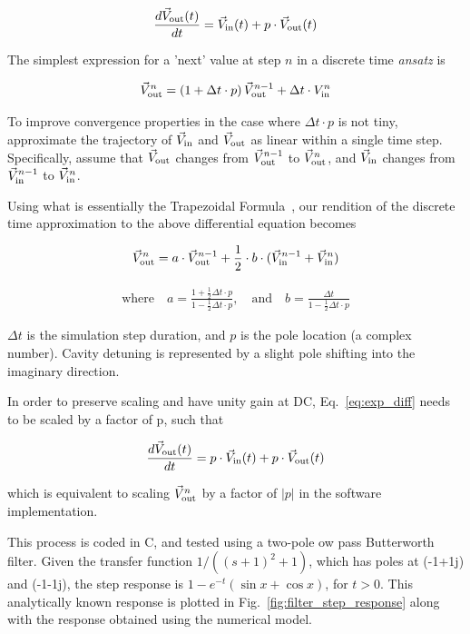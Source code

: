\documentclass[a4paper,12pt]{article}
\begin{document}
\begin{appendix}
\begin{equation}
 \frac{d\vec V_{\rm out}(t)}{dt} = \vec V_{\rm in}(t) + p\cdot \vec V_{\rm out}(t)
\label{eq:exp_diff}
\end{equation}

The simplest expression for a 'next' value at step $n$ in a discrete time \emph{ansatz} is

\begin{equation}
 \vec V_{\rm out}^n = \left( 1 + \Delta t \cdot p\right) \vec V_{\rm out}^{n-1} + \Delta t \cdot V_{\rm in}^n
\end{equation}

\noindent To improve convergence properties in the case where $\Delta t \cdot p$ is not tiny, approximate the trajectory of $\vec V_{\rm in}$ and $\vec V_{\rm out}$ as linear within a single time step. Specifically, assume that $\vec V_{\rm out}$ changes from $\vec V_{\rm out}^{n-1}$ to $\vec V_{\rm out}^n$, and $\vec V_{\rm in}$ changes from $\vec V_{\rm in}^{n-1}$ to $\vec V_{\rm in}^n$.

Using what is essentially the Trapezoidal Formula~\cite{ref:trapezoid}, our rendition of the discrete time approximation to the above differential equation becomes

\begin{equation} \label{eq:approx}
 	\vec V_{\rm out}^n=a \cdot \vec V_{\rm out}^{n-1}+\frac{1}{2}\cdot b \cdot (\vec V_{\rm in}^{n-1}+\vec V_{\rm in}^n)
\end{equation}

\begin{eqnarray}
	\nonumber \mbox{where} \quad a=\frac{1+ \frac{1}{2} \Delta t \cdot p}{1-\frac{1}{2}\Delta t \cdot p}, \quad \mbox{and} \quad b=\frac{\Delta t}{1-\frac{1}{2}\Delta t \cdot p}
\end{eqnarray}

\noindent $\Delta t$ is the simulation step duration, and $p$ is the pole location (a complex number). Cavity detuning is represented by a slight pole shifting into the imaginary direction.

In order to preserve scaling and have unity gain at DC, Eq.~\ref{eq:exp_diff} needs to be scaled by a factor of p, such that

\begin{equation}
 \frac{d\vec V_{\rm out}(t)}{dt} = p \cdot \vec V_{\rm in}(t) + p\cdot \vec V_{\rm out}(t)
\label{eq:exp_diff2}
\end{equation}

\noindent which is equivalent to scaling $\vec V_{\rm out}^n$ by a factor of $|p|$ in the software implementation.

This process is coded in C, and tested using a two-pole ow pass Butterworth filter. Given the transfer function $1/((s+1)^2+1)$, which has poles at (-1+1j) and (-1-1j), 
the step response is $1 - e^{-t} (\sin x + \cos x)$, for $t > 0$. This analytically known response is plotted in Fig.~\ref{fig:filter_step_response} along with the response obtained using the numerical model.


\end{appendix}
\end{document}
